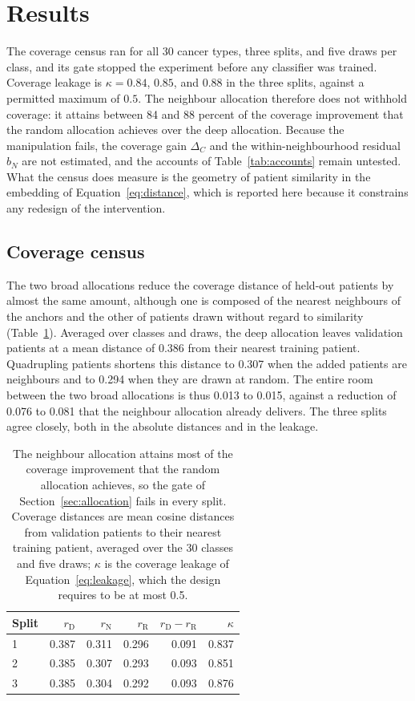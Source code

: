\section{Results}
\label{sec:results}
The coverage census ran for all 30 cancer types, three splits, and five draws per class, and its gate stopped the experiment before any classifier was trained. Coverage leakage is $\kappa=0.84$, $0.85$, and $0.88$ in the three splits, against a permitted maximum of $0.5$. The neighbour allocation therefore does not withhold coverage: it attains between 84 and 88 percent of the coverage improvement that the random allocation achieves over the deep allocation. Because the manipulation fails, the coverage gain $\Delta_C$ and the within-neighbourhood residual $b_N$ are not estimated, and the accounts of Table~\ref{tab:accounts} remain untested. What the census does measure is the geometry of patient similarity in the embedding of Equation~\eqref{eq:distance}, which is reported here because it constrains any redesign of the intervention.

\subsection{Coverage census}
\label{sec:census-results}
The two broad allocations reduce the coverage distance of held-out patients by almost the same amount, although one is composed of the nearest neighbours of the anchors and the other of patients drawn without regard to similarity (Table~\ref{tab:census}). Averaged over classes and draws, the deep allocation leaves validation patients at a mean distance of 0.386 from their nearest training patient. Quadrupling patients shortens this distance to 0.307 when the added patients are neighbours and to 0.294 when they are drawn at random. The entire room between the two broad allocations is thus 0.013 to 0.015, against a reduction of 0.076 to 0.081 that the neighbour allocation already delivers. The three splits agree closely, both in the absolute distances and in the leakage.

\begin{table}[htbp]
\centering
\renewcommand{\arraystretch}{1.15}
\begin{tabular}{@{}lrrrrr@{}}
\toprule
Split & $r_{\mathrm D}$ & $r_{\mathrm N}$ & $r_{\mathrm R}$ & $r_{\mathrm D}-r_{\mathrm R}$ & $\kappa$ \\
\midrule
1 & 0.387 & 0.311 & 0.296 & 0.091 & 0.837 \\
2 & 0.385 & 0.307 & 0.293 & 0.093 & 0.851 \\
3 & 0.385 & 0.304 & 0.292 & 0.093 & 0.876 \\
\bottomrule
\end{tabular}
\caption{The neighbour allocation attains most of the coverage improvement that the random allocation achieves, so the gate of Section~\ref{sec:allocation} fails in every split. Coverage distances are mean cosine distances from validation patients to their nearest training patient, averaged over the 30 classes and five draws; $\kappa$ is the coverage leakage of Equation~\eqref{eq:leakage}, which the design requires to be at most 0.5.}
\label{tab:census}
\end{table}

